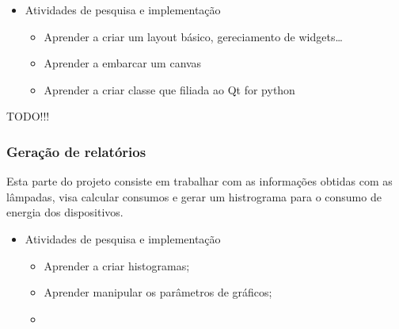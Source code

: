 \documentclass[11pt]{article}
\begin{document}
\begin{itemize}
\item Atividades de pesquisa e implementação
\begin{itemize}
\item Aprender a criar um layout básico, gereciamento de widgets\ldots{}
\item Aprender a embarcar um canvas
\item Aprender a criar classe que filiada ao Qt for python
\end{itemize}
\end{itemize}
TODO!!!

\subsubsection{Geração de relatórios}
\label{sec:orgae184b7}
Esta parte do projeto consiste em trabalhar com as informações obtidas com as lâmpadas, visa calcular consumos e gerar um histrograma para o consumo de energia dos dispositivos.

\begin{itemize}
\item Atividades de pesquisa e implementação
\begin{itemize}
\item Aprender a criar histogramas;
\item Aprender manipular os parâmetros de gráficos;
\item 
\end{itemize}
\end{itemize}
\end{document}
